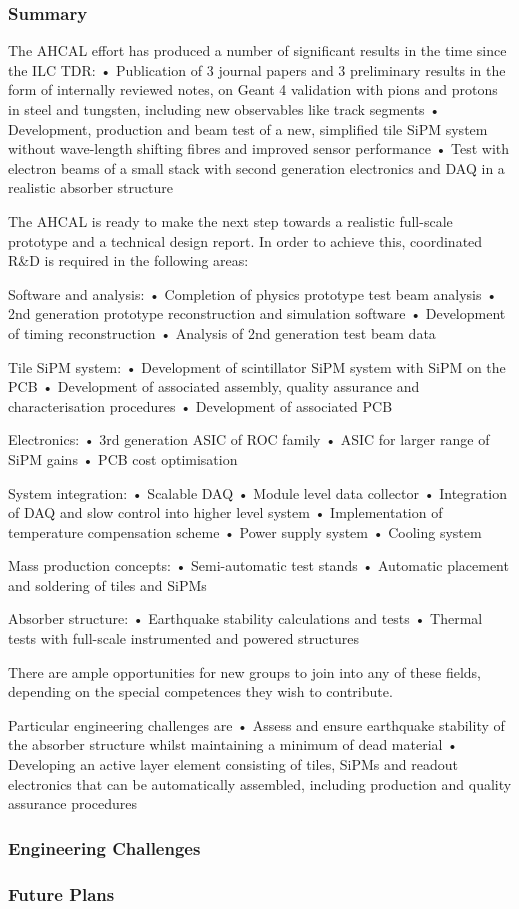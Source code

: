 \subsubsection{Summary}
The AHCAL effort has produced a number of significant results in the time since the ILC TDR: 
•   Publication of 3 journal papers and 3 preliminary results in the form of internally reviewed notes, on Geant 4 validation with pions and protons in steel and tungsten, including new observables like track segments
•   Development, production and beam test of a new, simplified tile SiPM system without wave-length shifting fibres and improved sensor performance
•   Test with electron beams of a small stack with second generation electronics and DAQ in a realistic absorber structure

The AHCAL is ready to make the next step towards a realistic full-scale prototype and a technical design report. In order to achieve this, coordinated R\&D is required in the following areas:

Software and analysis:
•   Completion of physics prototype test beam analysis 
•   2nd generation prototype reconstruction and simulation software 
•   Development of timing reconstruction
•   Analysis of 2nd generation test beam data 

Tile SiPM system:
•   Development of scintillator SiPM system with SiPM on the PCB
•   Development of associated assembly, quality assurance and characterisation procedures
•   Development of associated PCB

Electronics:
•   3rd generation ASIC of ROC family
•   ASIC for larger range of SiPM gains
•   PCB cost optimisation 

System integration:
•   Scalable DAQ
•   Module level data collector
•   Integration of DAQ and slow control into higher level system
•   Implementation of temperature compensation scheme
•   Power supply system
•   Cooling system

Mass production concepts:
•   Semi-automatic test stands
•   Automatic placement and soldering of tiles and SiPMs

Absorber structure:
•   Earthquake stability calculations and tests
•   Thermal tests with full-scale instrumented and powered structures  

There are ample opportunities for new groups to join into any of these fields, depending on the special competences they wish to contribute. 

Particular engineering challenges are 
•   Assess and ensure earthquake stability of the absorber structure whilst maintaining a minimum of dead material
•   Developing an active layer element consisting of tiles, SiPMs and readout electronics that can be automatically assembled, including production and quality assurance procedures

\subsubsection{Engineering Challenges}
\subsubsection{Future Plans}